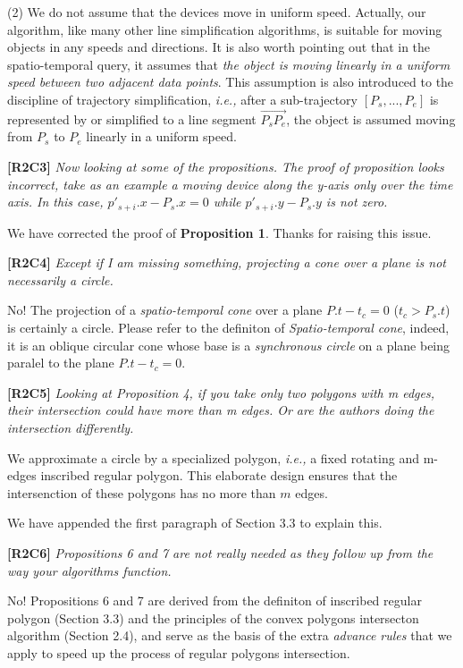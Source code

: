 \documentclass{letter}
\newcommand{\ie}{\emph{i.e.,}\xspace}
\begin{document}
(2) We do not assume that the devices move in uniform speed. Actually, our algorithm, like many other line simplification algorithms, is suitable for moving objects in any speeds and directions. It is also worth pointing out that in the spatio-temporal query, it assumes that \textit{the object is moving linearly in a uniform speed between two adjacent data points}. This assumption is also introduced to the discipline of trajectory simplification, \ie after a sub-trajectory $[P_s, ..., P_e]$ is represented by or simplified to a line segment $\overrightarrow{P_sP_e}$, the object is assumed moving from $P_s$ to $P_e$ linearly in a uniform speed.  

\textbf{[R2C3]} \emph{Now looking at some of the propositions.
The proof of proposition looks incorrect, take as an example a moving device along the y-axis only over the time axis. In this case, $p'_{s+i}.x - P_s.x = 0$ while $p'_{s+i}.y - P_s.y$ is not zero.
}

We have corrected the proof of \textbf{Proposition 1}. Thanks for raising this issue.


\textbf{[R2C4]} \emph{Except if I am missing something, projecting a cone over a plane is not necessarily a circle.}

No! The projection of a \emph{spatio-temporal cone} over a plane $P.t- t_c = 0$ ($t_c > P_s.t$) is certainly a circle. Please refer to the definiton of \emph{Spatio-temporal cone}, indeed, it is an oblique circular cone whose base is a  \emph{synchronous circle} on a plane being paralel to the plane $P.t- t_c = 0$. 

\textbf{[R2C5]} \emph{Looking at Proposition 4, if you take only two polygons with m edges, their intersection could have more than m edges. Or are the authors doing the intersection differently.}

We approximate a circle by a specialized polygon, \ie a fixed rotating and m-edges inscribed regular polygon. This elaborate design ensures that the intersenction of these polygons has no more than $m$ edges. 

We have appended the first paragraph of Section 3.3 to explain this. 

\textbf{[R2C6]} \emph{Propositions 6 and 7 are not really needed as they follow up from the way your algorithms function.}

No! Propositions 6 and 7 are derived from the definiton of inscribed regular polygon (Section 3.3) and the principles of the convex polygons intersecton algorithm (Section 2.4), and serve as the basis of the extra \emph{advance rules} that we apply to speed up the process of regular polygons intersection. 
\end{document}
